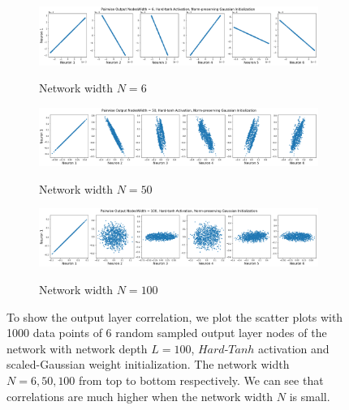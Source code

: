 \begin{figure}
\centering
\newcommand{\myWidth}{.9\textwidth}
\begin{subfigure}{\myWidth}
  \centering
  \caption{Network width $N=6$}
  \includegraphics[width=1.0\linewidth,trim={0 0 0 0.8cm},clip]{"InitialCorrelation - HardTanhWidth6"}
  \label{fig:sec4_sim1_a}
\end{subfigure}%

\begin{subfigure}{\myWidth}
  \centering
  \caption{Network width $N=50$}
  \includegraphics[width=1.0\linewidth,trim={0 0 0 0.8cm},clip]{"InitialCorrelation - HardTanhWidth50"}
  \label{fig:sec4_sim1_b}
\end{subfigure}%

\begin{subfigure}{\myWidth}
  \centering
  \caption{Network width $N=100$}
  \includegraphics[width=1.0\linewidth,trim={0 0 0 0.8cm},clip]{"InitialCorrelation - HardTanhWidth100"}
  \label{fig:sec4_sim1_c}
\end{subfigure}%

\caption{To show the output layer correlation, we plot the scatter plots with 1000 data points of 6 random sampled output layer nodes of the network with network depth $L=100$, $Hard\text{-}Tanh$ activation and scaled-Gaussian weight initialization. The network width $N=6, 50, 100$ from top to bottom respectively. We can see that correlations are much higher when the network width $N$ is small.}
\label{fig:sec4_sim1}
\end{figure}